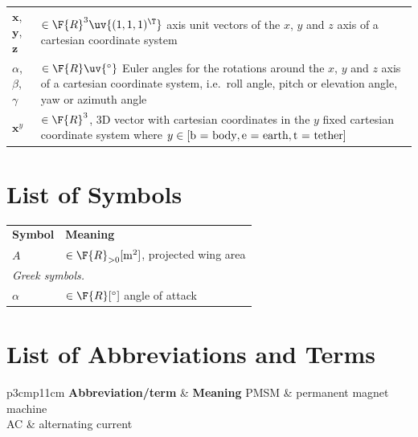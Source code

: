 \documentclass[journal]{IEEEtran}
\renewcommand{\t}[1]{\text{\normalfont{#1}}} %
\renewcommand{\v}{\boldsymbol} %
\begin{document}
{\begin{longtable}[H]{p{3cm}p{11cm}}
		\\\hline
				$\v{x}$, $\v{y}$, $\v{z}$
			&
				$\in \F{R}^3 \uv{(1, 1, 1)^\T}$
				axis unit vectors of the $x$, $y$ and $z$ axis of a cartesian coordinate system
		\\
				$\alpha$, $\beta$, $\gamma$
			&
				$\in \F{R} \uv{^\circ}$
				Euler angles for the rotations around the $x$, $y$ and $z$ axis of a cartesian coordinate system, i.e.\ roll angle, pitch or elevation angle, yaw or azimuth angle
		\\\hline
				$\v{x}^y$
			&
				$\in \F{R}^3$, 3D vector with cartesian coordinates in the $y$ fixed cartesian coordinate system where $y \in [ \t{b = body}, \t{e = earth}, \t{t = tether} ]$
	\end{longtable}
	
	
	\newpage
	
	\chapter*{List of Symbols}
	
	\begin{longtable}[H]{p{3cm}p{11cm}}
				\textsf{\textbf{Symbol}}
			&
				\textsf{\textbf{Meaning}}
		\hline\endhead
			\multicolumn{2}{l}{\textit{Latin symbols.}}
		\\
				$A$
			&
				$\in \F{R}_{> 0} \unit{[m^2]}$, projected wing area
		\\\hline%
			\multicolumn{2}{l}{\textit{Greek symbols.}}
		\\
				$\alpha$
			&
				$\in \F{R} \unit{[^\circ]}$
				angle of attack
	\end{longtable}
	
	
	
	\chapter*{List of Abbreviations and Terms}
	
	\begin{longtable}[H]{p{3cm}p{11cm}}
				\textsf{\textbf{Abbreviation/term}}
			&
				\textsf{\textbf{Meaning}}
		\hline\endhead
				PMSM
			&
				permanent magnet machine
		\\
				AC
			&
				alternating current
	\end{longtable}
	
}{}
\end{document}
